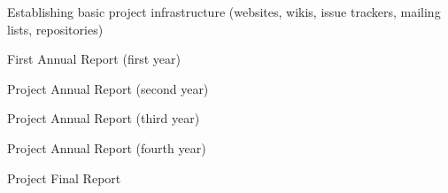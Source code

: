 \begin{workpackage}
\begin{wpdelivs}
\begin{wpdeliv}[due=1,id=tickets,dissem=PU,nature=DEC]{Establishing basic project infrastructure 
(websites, wikis, issue trackers, mailing lists, repositories)}
\end{wpdeliv}
\begin{wpdeliv}[due=12,id=periodic-rep-1,dissem=PU,nature=R]{First Annual Report (first year)}
 \end{wpdeliv}
\begin{wpdeliv}[due=24,id=periodic-rep-2,dissem=PU,nature=R]{Project Annual Report (second year)}
 \end{wpdeliv}
\begin{wpdeliv}[due=36,id=periodic-rep-3,dissem=PU,nature=R]{Project Annual Report (third year)}
 \end{wpdeliv}
\begin{wpdeliv}[due=48,id=periodic-rep-4,dissem=PU,nature=R]{Project Annual Report (fourth year)}
 \end{wpdeliv}
\begin{wpdeliv}[due=48,id=final-mgt-rep,dissem=PU,nature=R]{Project Final Report}
 \end{wpdeliv}
\end{wpdelivs}
\end{workpackage}

